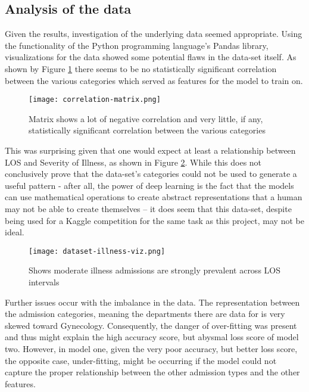 \documentclass[sigconf,authorversion]{acmart}
\begin{document}
\subsection{Analysis of the data}
Given the  results, investigation of the underlying data seemed appropriate. Using the functionality of the Python programming language's Pandas library, visualizations for the data showed some potential flaws in the data-set itself. As shown by Figure \ref{fig: correlation-matrix} there seems to be no statistically significant correlation between the various categories which served as features for the model to train on. 
%
\begin{figure}[h]
    \centering
    \texttt{[image: correlation-matrix.png]}
    \caption{Matrix shows a lot of negative correlation and very little, if any, statistically significant correlation between the various categories}
    \label{fig: correlation-matrix}
\end{figure}
%
This was surprising given that one would expect at least a relationship between LOS and Severity of Illness, as shown in Figure \ref{fig: illness-to-LOS}. While this does not conclusively prove that the data-set's categories could not be used to generate a useful pattern - after all, the power of deep learning is the fact that the models can use mathematical operations to create abstract representations that a human may not be able to create themselves\cite{Abril07} -- it does seem that this data-set, despite being used for a Kaggle competition for the same task as this project, may not be ideal. 
%
\begin{figure}[h]
    \centering
    \texttt{[image: dataset-illness-viz.png]}
    \caption{Shows moderate  illness admissions are strongly prevalent across LOS intervals }
    \label{fig: illness-to-LOS}
\end{figure}
%
Further issues occur with the imbalance in the data. The representation between the admission categories, meaning the departments there are data for is very skewed toward Gynecology. Consequently, the danger of over-fitting was present and thus might explain the high accuracy score, but abysmal  loss score of model two. However, in model one, given the very poor accuracy, but better loss score, the opposite case, under-fitting, might be occurring if the model could not capture the proper relationship between the other admission types and the other features. 
\end{document}
